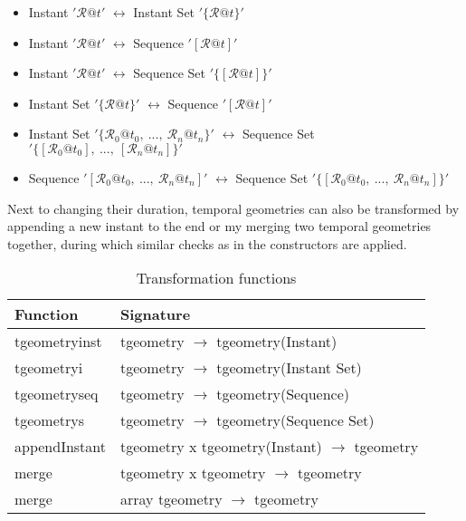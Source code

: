 \begin{itemize}
    \item Instant $'\mathcal{R}@t'$ $\leftrightarrow$ Instant Set $'\{\mathcal{R}@t\}'$
    \item Instant $'\mathcal{R}@t'$ $\leftrightarrow$ Sequence $'[\mathcal{R}@t]'$
    \item Instant $'\mathcal{R}@t'$ $\leftrightarrow$ Sequence Set $'\{[\mathcal{R}@t]\}'$
    \item Instant Set $'\{\mathcal{R}@t\}'$ $\leftrightarrow$ Sequence $'[\mathcal{R}@t]'$
    \item Instant Set $'\{\mathcal{R}_0@t_0,\ ...,\ \mathcal{R}_n@t_n\}'$ $\leftrightarrow$ Sequence Set $'\{[\mathcal{R}_0@t_0],\ ...,\ [\mathcal{R}_n@t_n]\}'$
    \item Sequence $'[\mathcal{R}_0@t_0,\ ...,\ \mathcal{R}_n@t_n]'$ $\leftrightarrow$ Sequence Set $'\{[\mathcal{R}_0@t_0,\ ...,\ \mathcal{R}_n@t_n]\}'$
\end{itemize}

Next to changing their duration, temporal geometries can also be transformed by appending a new instant to the end or my merging two temporal geometries together, during which similar checks as in the constructors are applied.

\begin{table}[h!]
    \centering
    \begin{tabularx}{\textwidth}{|l|X|}
    \hline
    \textbf{Function}   & \textbf{Signature} \\ 
    \hline
    tgeometryinst       & tgeometry $\rightarrow$ tgeometry(Instant) \\
    \hline
    tgeometryi          & tgeometry $\rightarrow$ tgeometry(Instant Set) \\
    \hline
    tgeometryseq        & tgeometry $\rightarrow$ tgeometry(Sequence) \\
    \hline
    tgeometrys          & tgeometry $\rightarrow$ tgeometry(Sequence Set) \\
    \hline
    \hline
    appendInstant       & tgeometry x tgeometry(Instant) $\rightarrow$ tgeometry \\
    \hline
    merge               & tgeometry x tgeometry $\rightarrow$ tgeometry \\
    \hline
    merge               & array tgeometry $\rightarrow$ tgeometry \\
    \hline
    \end{tabularx}
    \caption{Transformation functions}
    \label{table:transformation_funcs}
\end{table}

